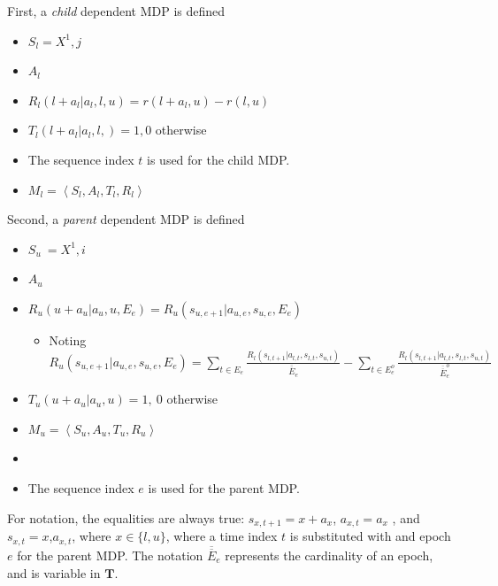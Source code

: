 \documentclass[compsoc,journal,letterpaper,10pt,draftcls,twocolumn]{IEEEtran}
\begin{document}
First, a \emph{child} dependent MDP is defined

\begin{itemize}
\item
  \(S_{l}  = X^{1}, j\)
\item
  \(A_{l}\)
\item
  \(R_{l}\left( l + a_{l}|a_{l},l,u \right) = r\left( l + a_{l}, u \right) - r(l,u)\)
\item
  \(T_{l}\left( l + a_{l}|a_{l}, l, \right) = 1, 0\) otherwise
\item
  The sequence index \(t\) is used for the child MDP.
\item
  \(M_{l} = \left\langle S_{l}, A_{l} ,T_{l}, R_{l} \right\rangle\)
\end{itemize}

Second, a \emph{parent} dependent MDP is defined

\begin{itemize}
\item
  \(S_{u}\  = X^{1},i\)
\item
  \(A_{u}\)
\item
  \(R_{u}\left( u + a_{u}|a_{u},u,E_{e} \right) = R_{u}\left( s_{u,e + 1}|a_{u,e},s_{u,e},E_{e} \right)\)

  \begin{itemize}
  \item
    Noting
    \(R_{u}\left( s_{u,e + 1}|a_{u,e}, s_{u,e}, E_{e} \right) = \sum_{t \in E_{e}}^{\ }\frac{R_{l}\left( s_{l,t + 1}|a_{l,t}, s_{l,t}, s_{u,t} \right)}{\overline{\overline E}_{e}} - \sum_{t \in E_{e}^{o}}^{\ }\frac{R_{l}\left( s_{l,t + 1}|a_{l,t},s_{l,t},s_{u,t} \right)}{\overline{\overline E}_{e}^{o}}\)
  \end{itemize}
\item
  \(T_{u}\left( u + a_{u}|a_{u}, u \right) = 1,\ 0\) otherwise
\item
  \(M_{u} = \left\langle S_{u}, A_{u}, T_{u}, R_{u} \right\rangle\)
\item
\item
  The sequence index \(e\) is used for the parent MDP.
\end{itemize}

For notation, the equalities are always true:
\(s_{x,t + 1} = x + a_{x}\), \(a_{x,t} = a_{x}\) ,
and\(s_{x,t} = x\),\(a_{x,t}\), where \(x \in \{ l,u\}\), where a time
index \(t\) is substituted with and epoch \(e\) for the parent MDP. The
notation \(\overline{\overline E}_{e}\) represents the cardinality of an epoch,
and is variable in \(\mathbf{T}\).
\end{document}

